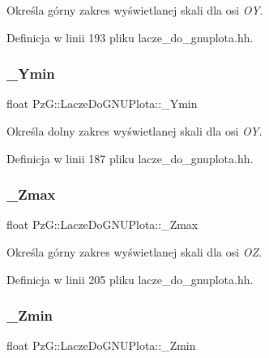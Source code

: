 Określa górny zakres wyświetlanej skali dla osi {\itshape OY}. 

Definicja w linii 193 pliku lacze\+\_\+do\+\_\+gnuplota.\+hh.

\mbox{\label{class_pz_g_1_1_lacze_do_g_n_u_plota_abc555fd6b82b0d5c9efb4802b58dc317}} 
\subsubsection{\texorpdfstring{\_Ymin}{\_Ymin}}
{\footnotesize\ttfamily float Pz\+G\+::\+Lacze\+Do\+G\+N\+U\+Plota\+::\+\_\+\+Ymin\hspace{0.3cm}{\ttfamily [protected]}}

Określa dolny zakres wyświetlanej skali dla osi {\itshape OY}. 

Definicja w linii 187 pliku lacze\+\_\+do\+\_\+gnuplota.\+hh.

\mbox{\label{class_pz_g_1_1_lacze_do_g_n_u_plota_a26949eedd421832f0f206ce3c8f90694}} 
\subsubsection{\texorpdfstring{\_Zmax}{\_Zmax}}
{\footnotesize\ttfamily float Pz\+G\+::\+Lacze\+Do\+G\+N\+U\+Plota\+::\+\_\+\+Zmax\hspace{0.3cm}{\ttfamily [protected]}}

Określa górny zakres wyświetlanej skali dla osi {\itshape OZ}. 

Definicja w linii 205 pliku lacze\+\_\+do\+\_\+gnuplota.\+hh.

\mbox{\label{class_pz_g_1_1_lacze_do_g_n_u_plota_a8f9797e881df35f4206cb7d8030e5edc}} 
\subsubsection{\texorpdfstring{\_Zmin}{\_Zmin}}
{\footnotesize\ttfamily float Pz\+G\+::\+Lacze\+Do\+G\+N\+U\+Plota\+::\+\_\+\+Zmin\hspace{0.3cm}{\ttfamily [protected]}}

